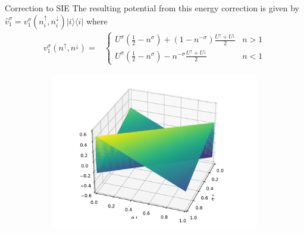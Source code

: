 \documentclass[xcolor=table,aspectratio=169]{beamer}
\newcommand{\bra}[1]{\langle #1|}
\newcommand{\ket}[1]{|#1\rangle}
\numberwithin{equation}{section}
\begin{document}
\begin{frame}{Correction to SIE}
    The resulting potential from this energy correction is given by $\hat v^\sigma_1 = v^\sigma_1(n^\uparrow_i, n^\downarrow_i) \ket{i}\bra{i}$ where
    \begin{align}
        v^\sigma_1(n^\uparrow, n^\downarrow)
        = &
        \begin{cases}
            U^\sigma\left(\frac{1}{2} - n^\sigma\right)
            + \left(1 - n^{-\sigma}\right)
            \frac{U^\uparrow + U^\downarrow}{2}
             & n > 1
            \\
            U^\sigma\left(\frac{1}{2} - n^\sigma\right)
            - n^{-\sigma}
            \frac{U^\uparrow + U^\downarrow}{2}
             & n < 1
        \end{cases}
        \label{eqn:novel_u_potential}
    \end{align}
    \begin{figure}[t!]
        \begin{subfigure}[b]{0.3\columnwidth}
            \includegraphics[width=\columnwidth]{figures/novel_u_potential.pdf}

\end{subfigure}
\end{figure}
\end{frame}
\end{document}
